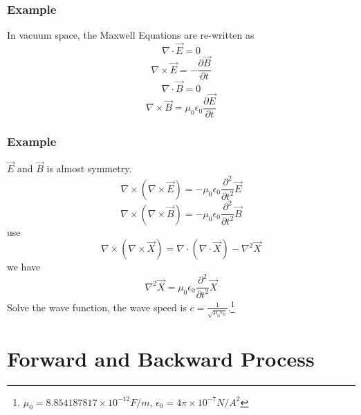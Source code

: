 \documentclass{beamer}
\begin{document}
\begin{frame}
    \frametitle{Example}
    In vacuum space, the Maxwell Equations are re-written as
    \begin{equation}
        \nabla \cdot \vec{E} = 0
    \end{equation}
    \begin{equation}
        \nabla \times \vec{E} = - \frac{\partial{\vec{B}}}{\partial{t}}
    \end{equation}
    \begin{equation}
        \nabla \cdot \vec{B} = 0
    \end{equation}
    \begin{equation}
        \nabla \times \vec{B} = \mu_{0} \epsilon_{0} \frac{\partial{\vec{E}}}{\partial{t}}
    \end{equation}
\end{frame}

\begin{frame}
    \frametitle{Example}
    $\vec{E}$ and $\vec{B}$ is almost symmetry.
    \begin{equation}
        \nabla \times (\nabla \times \vec{E}) =
        - \mu_{0} \epsilon_{0} \frac{\partial^{2}}{\partial{t^{2}}} \vec{E}
    \end{equation}
    \begin{equation}
        \nabla \times (\nabla \times \vec{B}) = - \mu_{0} \epsilon_{0} \frac{\partial^{2}}{\partial{t^{2}}} \vec{B}
    \end{equation}
    use
    \begin{equation}
        \nabla \times (\nabla \times \vec{X}) =
        \nabla \cdot (\nabla \cdot \vec{X}) - \nabla^{2} \vec{X}
    \end{equation}
    we have
    \begin{equation}
        \nabla^{2} \vec{X} = \mu_{0} \epsilon_{0} \frac{\partial^{2}}{\partial{t^{2}}} \vec{X}
    \end{equation}
    Solve the wave function, the wave speed is $c=\frac{1}{\sqrt{\mu_{0} \epsilon_{0}}}$.\footnote{$\mu_{0}=8. 854187817 \times 10^{-12} F/m$, $\epsilon_{0}=4 \pi \times 10^{-7} N/A^{2}$}
\end{frame}

\section{Forward and Backward Process}
\end{document}
